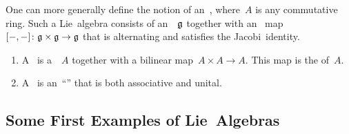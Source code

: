 \begin{remark}
	One can more generally define the notion of an~, where~$A$ is any commutative ring.
	Such a Lie~algebra consists of an~~$\mathfrak{g}$ together with an~ map~$[\ph, \ph] \colon \glie \times \glie \to \glie$ that is alternating and satisfies the Jacobi~identity.
\end{remark}


\begin{definition}
	\label{definitions of an algebra}
	\leavevmode
	\begin{enumerate}
		\item
			A~ is a~\vectorspace{$\kf$}~$A$ together with a bilinear map~$A \times A \to A$.
			This map is the  of~$A$.
		\item
			A~ is an~\enquote{\algebra{$\kf$}} that is both associative and unital.
	\end{enumerate}
\end{definition}


\subsection{Some First Examples of Lie~Algebras}


